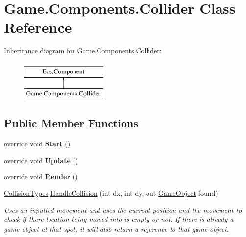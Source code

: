 \hypertarget{class_game_1_1_components_1_1_collider}{}\section{Game.\+Components.\+Collider Class Reference}
\label{class_game_1_1_components_1_1_collider}
Inheritance diagram for Game.\+Components.\+Collider\+:\begin{figure}[H]
\begin{center}
\leavevmode
\includegraphics[height=2.000000cm]{class_game_1_1_components_1_1_collider}
\end{center}
\end{figure}
\subsection*{Public Member Functions}
\begin{DoxyCompactItemize}
\item 
\mbox{\label{class_game_1_1_components_1_1_collider_a95f93ad13110b536fa365faed0fe4593}} 
override void {\bfseries Start} ()
\item 
\mbox{\label{class_game_1_1_components_1_1_collider_aa60b9a14541bc5beff644c9fe44ce313}} 
override void {\bfseries Update} ()
\item 
\mbox{\label{class_game_1_1_components_1_1_collider_a58566e658035ac726fa8d5587ece5ded}} 
override void {\bfseries Render} ()
\item 
\mbox{\hyperlink{namespace_game_1_1_data_structures_ada1f9e4784b55145987867a5daf71d4d}{Collision\+Types}} \mbox{\hyperlink{class_game_1_1_components_1_1_collider_a4b9f921f8563cdccd1b0dbf9664cc08f}{Handle\+Collision}} (int dx, int dy, out \mbox{\hyperlink{class_ecs_1_1_game_object}{Game\+Object}} found)
\begin{DoxyCompactList}\small\item\em Uses an inputted movement and uses the current position and the movement to check if there location being moved into is empty or not. If there is already a game object at that spot, it will also return a reference to that game object. \end{DoxyCompactList}\end{DoxyCompactItemize}
